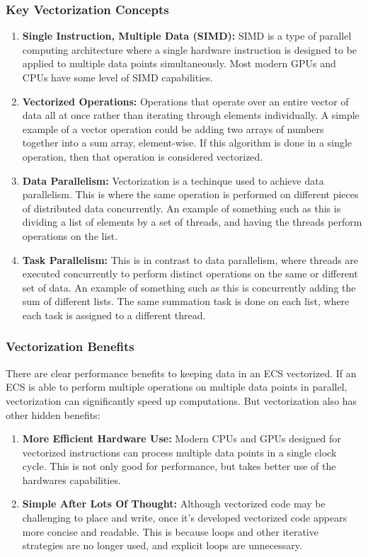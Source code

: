 \subsubsection{Key Vectorization Concepts}
\begin{enumerate}
    \item \textbf{Single Instruction, Multiple Data (SIMD):} SIMD is a type of parallel computing architecture where a single hardware instruction is designed to be applied to multiple data points simultaneously. Most modern GPUs and CPUs have some level of SIMD capabilities.
    \item \textbf{Vectorized Operations:} Operations that operate over an entire vector of data all at once rather than iterating through elements individually. A simple example of a vector operation could be adding two arrays of numbers together into a sum array, element-wise. If this algorithm is done in a single operation, then that operation is considered vectorized.
    \item \textbf{Data Parallelism:} Vectorization is a techinque used to achieve data parallelism. This is where the same operation is performed on different pieces of distributed data concurrently. An example of something such as this is dividing a list of elements by a set of threads, and having the threads perform operations on the list. 
    \item \textbf{Task Parallelism:} This is in contrast to data parallelism, where threads are executed concurrently to perform distinct operations on the same or different set of data. An example of something such as this is concurrently adding the sum of different lists. The same summation task is done on each list, where each task is assigned to a different thread. 
\end{enumerate}

\subsubsection{Vectorization Benefits}
There are clear performance benefits to keeping data in an ECS vectorized. If an ECS is able to perform multiple operations on multiple data points in parallel, vectorization can significantly speed up computations. But vectorization also has other hidden benefits:
\begin{enumerate}
    \item \textbf{More Efficient Hardware Use:} Modern CPUs and GPUs designed for vectorized instructions can process multiple data points in a single clock cycle. This is not only good for performance, but takes better use of the hardwares capabilities.
    \item \textbf{Simple After Lots Of Thought:} Although vectorized code may be challenging to place and write, once it's developed vectorized code appears more concise and readable. This is because loops and other iterative strategies are no longer used, and explicit loops are unnecessary.
\end{enumerate}

